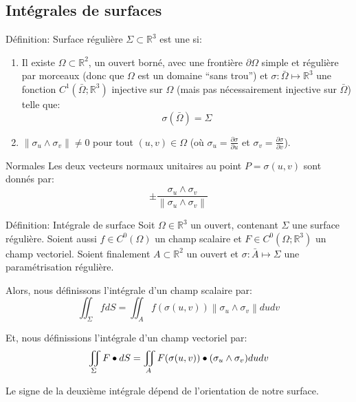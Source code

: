 \documentclass[a4paper]{article}
\begin{document}
\subsection{Intégrales de surfaces}
\begin{parag}{Définition: Surface régulière}
    $\Sigma \subset \mathbb{R}^3$ est une  si:
    \begin{enumerate}
        \item Il existe $\Omega \subset \mathbb{R}^2$, un ouvert borné, avec une frontière $\partial \Omega$ simple et régulière par morceaux (donc que $\Omega$ est un domaine ``sans trou'') et $\sigma: \bar{\Omega}\mapsto \mathbb{R}^3$ une fonction $C^1\left(\bar{\Omega};\mathbb{R}^3\right)$ injective sur $\Omega$ (mais pas nécessairement injective sur $\bar{\Omega}$) telle que: 
        \[\sigma\left(\bar{\Omega}\right) = \Sigma\]
        
        \item $\left\|\sigma_u \wedge \sigma_v\right\| \neq 0$ pour tout $\left(u, v\right) \in \Omega$ (où $\sigma_u = \frac{\partial \sigma}{\partial u} $ et $\sigma_v = \frac{\partial \sigma}{\partial v} $).
    \end{enumerate}

    \begin{subparag}{Normales}
        Les deux vecteurs normaux unitaires au point $P = \sigma\left(u, v\right)$ sont donnés par: 
        \[\pm \frac{\sigma_u \wedge \sigma_v}{\left\|\sigma_u \wedge \sigma_v\right\|}\]
    \end{subparag}
\end{parag}


\begin{parag}{Définition: Intégrale de surface}
    Soit $\Omega \in \mathbb{R}^3$ un ouvert, contenant $\Sigma$ une surface régulière. Soient aussi $f \in C^0\left(\Omega\right)$ un champ scalaire et $F \in C^{0}\left(\Omega; \mathbb{R}^3\right)$ un champ vectoriel. Soient finalement $A \subset \mathbb{R}^2$ un ouvert et $\sigma: \bar{A} \mapsto \Sigma$ une paramétrisation régulière.

    Alors, nous définissons l'intégrale d'un champ scalaire par: 
    \[\iint_{\Sigma} f dS = \iint_{A} f\left(\sigma\left(u, v\right)\right) \left\|\sigma_{u} \wedge \sigma_v\right\| dudv\]
    
    Et, nous définissions l'intégrale d'un champ vectoriel par: 
    \[\iint_{\Sigma} F \dotprod dS = \iint_{A} F\left(\sigma\left(u, v\right)\right) \dotprod \left(\sigma_u \wedge \sigma_v\right) dudv\]

    Le signe de la deuxième intégrale dépend de l'orientation de notre surface.
\end{parag}
\end{document}
